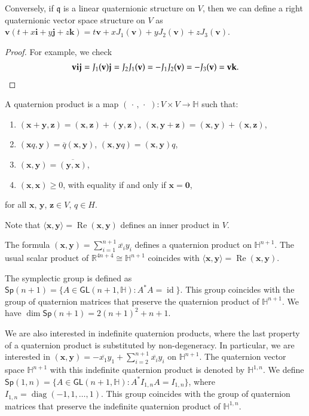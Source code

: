 \documentclass[12pt, a4paper]{amsart}
\newcommand{\id}{\operatorname{id}}
\newcommand{\g}{\mathfrak}
\newcommand{\R}{\mathbb{R}}
\renewcommand{\H}{\mathbb{H}}
\renewcommand{\Re}{\operatorname{Re}}
\newcommand{\Sp}{\mathsf{Sp}}
\theoremstyle{remark}
\begin{document}
Conversely, if $\g{q}$ is a linear quaternionic structure on $V$, then we can define a right quaternionic vector space structure on $V$ as $\mathbf{v}(t+x\mathbf{i}+y\mathbf{j}+z\mathbf{k})=t\mathbf{v}+xJ_1(\mathbf{v})+yJ_2(\mathbf{v})+zJ_3(\mathbf{v})$.

\begin{proof}
For example, we check
\[
\begin{aligned}
\mathbf{v}\mathbf{i}\mathbf{j}
=J_1(\mathbf{v})\mathbf{j}
=J_2 J_1(\mathbf{v})
=-J_1 J_2(\mathbf{v})
=-J_3(\mathbf{v})
=\mathbf{v}\mathbf{k}.
\end{aligned} \qedhere
\]
\end{proof}
\medskip

A quaternion product is a map $(\,\cdot\,,\,\cdot\,\,)\colon V\times V\to\H$ such that:
\begin{enumerate}
\item $(\mathbf{x}+\mathbf{y},\mathbf{z})
=(\mathbf{x},\mathbf{z})+(\mathbf{y},\mathbf{z})$,
$(\mathbf{x},\mathbf{y}+\mathbf{z})
=(\mathbf{x},\mathbf{y})+(\mathbf{x},\mathbf{z})$,
\item $(\mathbf{x}q,\mathbf{y})=\overline{q}(\mathbf{x},\mathbf{y})$, $(\mathbf{x},\mathbf{y}q)=(\mathbf{x},\mathbf{y}) q$,
\item $(\mathbf{x},\mathbf{y})=\overline{(\mathbf{y},\mathbf{x})}$,
\item $(\mathbf{x},\mathbf{x})\geq 0$, with equality if and only if $\mathbf{x}=\mathbf{0}$,
\end{enumerate}
for all $\mathbf{x}$, $\mathbf{y}$, $\mathbf{z}\in V$, $q\in H$.

Note that $\langle\mathbf{x},\mathbf{y}\rangle=\Re(\mathbf{x},\mathbf{y})$ defines an inner product in $V$.

The formula $(\mathbf{x},\mathbf{y})=\sum_{i=1}^{n+1} \overline{x_i}y_i$ defines a quaternion product on $\H^{n+1}$. The usual scalar product of $\R^{4n+4}\cong\H^{n+1}$ coincides with $\langle\mathbf{x},\mathbf{y}\rangle=\Re(\mathbf{x},\mathbf{y})$.

The symplectic group is defined as $\Sp(n+1)=\{A\in\mathsf{GL}(n+1,\H):A^* A=\id\}$.
This group coincides with the group of quaternion matrices that preserve the quaternion product of $\H^{n+1}$.	
We have $\dim\Sp(n+1)=2(n+1)^2+n+1$.

We are also interested in indefinite quaternion products, where the last property of a quaternion product is substituted by non-degeneracy.
In particular, we are interested in $(\mathbf{x},\mathbf{y})=-\overline{x_1}y_1+\sum_{i=2}^{n+1} \overline{x_i}y_i$ on $\H^{n+1}$.
The quaternion vector space $\H^{n+1}$ with this indefinite quaternion product is denoted by $\H^{1,n}$.
We define $\Sp(1,n)=\{A\in\mathsf{GL}(n+1,\H):A^*I_{1,n}A=I_{1,n}\}$, where $I_{1,n}=\operatorname{diag}(-1,1,\dots,1)$.
This group coincides with the group of quaternion matrices that preserve the indefinite quaternion product of $\H^{1,n}$.	
\end{document}

